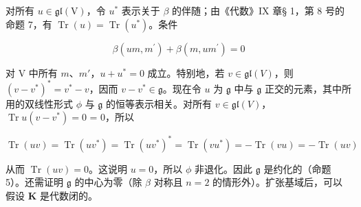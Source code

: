 对所有 \(u \in \mathfrak{gl}(\mathrm{V})\)，令 \(u^*\) 表示关于 \(\beta\) 的伴随；由《代数》IX 章§ 1，第 8 号的命题 7，有 \(\operatorname{Tr}(u) = \operatorname{Tr}(u^*)\)。条件

\[
\beta (u m, m ^ {\prime}) + \beta (m, u m ^ {\prime}) = 0
\]

对 V 中所有 \(m\)、\(m'\)，\(u + u^{*} = 0\) 成立。特别地，若 \(v \in \mathfrak{gl}(V)\)，则 \((v - v^{*})^{*} = v^{*} - v\)，因而 \(v - v^{*} \in \mathfrak{g}\)。现在令 \(u\) 为 \(\mathfrak{g}\) 中与 \(\mathfrak{g}\) 正交的元素，其中所用的双线性形式 \(\phi\) 与 \(\mathfrak{g}\) 的恒等表示相关。对所有 \(v \in \mathfrak{gl}(V)\)，\(\operatorname{Tr} u(v - v^{*}) = 0\) = 0，所以

\[
\operatorname{Tr} (u v) = \operatorname{Tr} (u v ^ {*}) = \operatorname{Tr} (u v ^ {*}) ^ {*} = \operatorname{Tr} (v u ^ {*}) = - \operatorname{Tr} (v u) = - \operatorname{Tr} (u v)
\]

从而 \(\operatorname{Tr}(u v) = 0\)。这说明 \(u = 0\)，所以 \(\phi\) 非退化。因此 \(\mathfrak{g}\) 是约化的（命题 5）。还需证明 \(\mathfrak{g}\) 的中心为零（除 \(\beta\) 对称且 \(n = 2\) 的情形外）。扩张基域后，可以假设 \(\mathbf{K}\) 是代数闭的。

